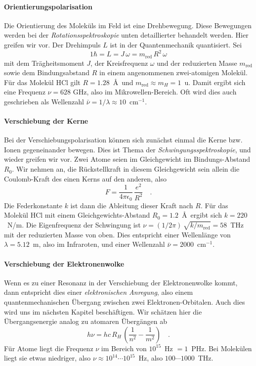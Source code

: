 \paragraph{Orientierungspolarisation} Die Orientierung des Moleküls im Feld ist eine Drehbewegung. Diese Bewegungen werden bei der \emph{Rotationsspektroskopie} unten detaillierter behandelt werden. Hier greifen wir vor. Der Drehimpuls $L$ ist in der Quantenmechanik quantisiert. Sei
\begin{equation}
1 \hbar = L = J \, \omega = m_\text{red} \, R^2 \, \omega
\end{equation}
mit dem Trägheitsmoment $J$, der Kreisfrequenz $\omega$ und der reduzierten Masse 
 $m_\text{red}$ sowie dem Bindungsabstand $R$ in einem angenommenen zwei-atomigen Molekül. Für das Molekül HCl gilt $R = 1.28$~\AA\ und $m_\text{red} \approx m_H = 1$~u. Damit ergibt sich eine Frequenz $\nu = 628$ GHz, also im Mikrowellen-Bereich. Oft wird dies auch geschrieben als Wellenzahl $\bar{\nu} = 1 /\lambda \approx 10$~cm$^{-1}$.
 
\paragraph{Verschiebung der Kerne} Bei der Verschiebungspolarisation können sich zunächst einmal die Kerne bzw. Ionen gegeneinander bewegen. Dies ist Thema der \emph{Schwingungsspektroskopie}, und wieder greifen wir vor. Zwei Atome seien im Gleichgewicht  im Bindungs-Abstand $R_0$. Wir nehmen an, die Rückstellkraft in diesem Gleichgewicht sein allein die Coulomb-Kraft des einen Kerns auf den anderen, also 
\begin{equation}
F = \frac{1}{4 \pi \epsilon_0} \, \frac{e^2}{R^2} \quad .
\end{equation}
Die Federkonstante $k$ ist dann die Ableitung dieser Kraft nach $R$. Für das Molekül HCl mit einem Gleichgewichts-Abstand $R_0 = 1.2$~\AA\ ergibt sich $k = 220$~N/m. Die Eigenfrequenz der Schwingung  ist $\nu = (1/2\pi) \, \sqrt{k/m_\text{red}} = 58$~THz mit der reduzierten Masse von oben. Dies entspricht einer Wellenlänge von $\lambda = 5.12$~\textmu m, also im Infraroten, und einer Wellenzahl $\bar{\nu} = 2000$~cm$^{-1}$.

\paragraph{Verschiebung der Elektronenwolke} Wenn es zu einer Resonanz in der Verschiebung der Elektronenwolke kommt, dann entspricht dies einer \emph{elektronischen Anregung}, also einem quantenmechanischen Übergang zwischen zwei Elektronen-Orbitalen. Auch dies wird uns  im nächsten Kapitel beschäftigen. Wir schätzen hier die Übergangsenergie analog zu atomaren Übergängen ab
\begin{equation}
  h \nu = hc \, R_H \, \left( \frac{1}{n^2} - \frac{1}{m^2} \right) \quad .
\end{equation}
Für Atome liegt die Frequenz $\nu$ im Bereich von $10^{15}$~Hz $= 1$~PHz. Bei Molekülen liegt sie etwas niedriger, also $\nu \approx 10^{14} \cdots 10^{15}$~Hz, also $100 \cdots 1000$~THz.


